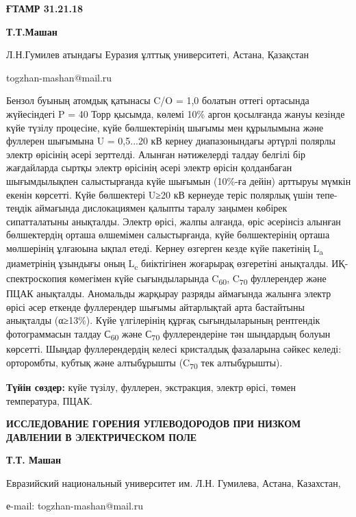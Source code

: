 \newpage
{\bfseries ҒТАМР 31.21.18}


\begin{center}
{\bfseries Т.Т.Машан}

Л.Н.Гумилев атындағы Еуразия ұлттық университеті, Астана, Қазақстан

togzhan-mashan@mail.ru
\end{center}

Бензол буының атомдық қатынасы C/O = 1,0 болатын оттегі ортасында
жүйесіндегі P = 40 Торр қысымда, көлемі 10\% аргон қосылғанда жануы
кезінде күйе түзілу процесіне, күйе бөлшектерінің шығымы мен құрылымына
және фуллерен шығымына U = 0,5...20 кВ кернеу диапазонындағы әртүрлі
полярлы электр өрісінің әсері зерттелді. Алынған нәтижелерді талдау
белгілі бір жағдайларда сыртқы электр өрісінің әсері электр өрісін
қолданбаған шығымдылықпен салыстырғанда күйе шығымын (10\%-ға дейін)
арттыруы мүмкін екенін көрсетті. Күйе бөлшектері U≥20 кВ кернеуде теріс
полярлық үшін тепе-теңдік аймағында дислокациямен қалыпты таралу заңымен
көбірек сипатталатыны анықталды. Электр өрісі, жалпы алғанда, өріс
әсерінсіз алынған бөлшектердің орташа өлшемімен салыстырғанда, күйе
бөлшектерінің орташа мөлшерінің ұлғаюына ықпал етеді. Кернеу өзгерген
кезде күйе пакетінің L\textsubscript{a} диаметрінің ұзындығы оның
L\textsubscript{c} биіктігінен жоғарырақ өзгеретіні анықталды.
ИҚ-спектроскопия көмегімен күйе сығындыларында C\textsubscript{60},
C\textsubscript{70} фуллерендер және ПЦАК анықталды. Аномальды жарқырау
разряды аймағында жалынға электр өрісі әсер еткенде фуллерендер шығымы
айтарлықтай арта бастайтыны анықталды (α≥13\%). Күйе үлгілерінің құрғақ
сығындыларының рентгендік фотограммасын талдау С\textsubscript{60} және
С\textsubscript{70} фуллерендеріне тән шыңдардың болуын көрсетті. Шыңдар
фуллерендердің келесі кристалдық фазаларына сәйкес келеді: орторомбты,
кубтық және алтыбұрышты (C\textsubscript{70} тек алтыбұрышты).

{\bfseries Түйін сөздер:} күйе түзілу, фуллерен, экстракция, электр өрісі,
төмен температура, ПЦАК.

\begin{center}
{\large\bfseries ИССЛЕДОВАНИЕ ГОРЕНИЯ УГЛЕВОДОРОДОВ ПРИ НИЗКОМ ДАВЛЕНИИ В
ЭЛЕКТРИЧЕСКОМ ПОЛЕ}

{\bfseries Т.Т. Машан}

Евразийский национальный университет им. Л.Н. Гумилева, Астана,
Казахстан,

е-mail: togzhan-mashan@mail.ru
\end{center}

